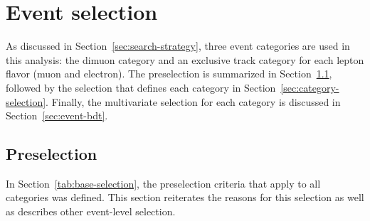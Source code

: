 \clearpage
\section{Event selection}
\label{sec:event-selection}

As discussed in Section~\ref{sec:search-strategy}, three event categories are used in this analysis: the dimuon category and an exclusive track category for each lepton flavor (muon and electron). The preselection is summarized in Section~\ref{sec:preselection}, followed by the selection that defines each category in Section~\ref{sec:category-selection}. Finally, the multivariate selection for each category is discussed in Section~\ref{sec:event-bdt}.

\subsection{Preselection}
\label{sec:preselection}

In Section~\ref{tab:base-selection}, the preselection criteria that apply to all categories was defined. This section reiterates the reasons for this selection as well as describes other event-level selection.

